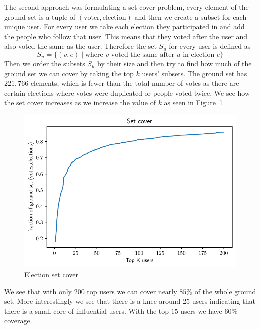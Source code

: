 The second approach was formulating a set cover problem, every element of the ground set is a tuple of $(\text{voter},\text{election})$ and then we create a subset for each unique user. For every user we take each election they participated in and add the people who follow that user. This means that they voted after the user and also voted the same as the user. Therefore the set $S_u$ for every user is defined as 
\[
    S_{u} = \{(v,e) \mid \text{where } v \text{ voted the same after } u \text{ in election }e  \} 
\]
Then we order the subsets $S_u$ by their size and then try to find how much of the ground set we can cover by taking the top $k$ users' subsets. The ground set has $221,766$ elements, which is fewer than the total number of votes as there are certain elections where votes were duplicated or people voted twice. We see how the set cover increases as we increase the value of $k$ as seen in Figure~\ref{fig:set-cover}
\begin{figure}[!ht]
    \centering
    \includegraphics[width=\linewidth]{images/set_cover.pdf}
    \caption{Election set cover}
    \label{fig:set-cover}
\end{figure}
We see that with only $200$ top users we can cover nearly $85\%$ of the whole ground set. More interestingly we see that there is a knee around 25 users indicating that there is a small core of influential users. With the top $15$ users we have $60\%$ coverage. 

